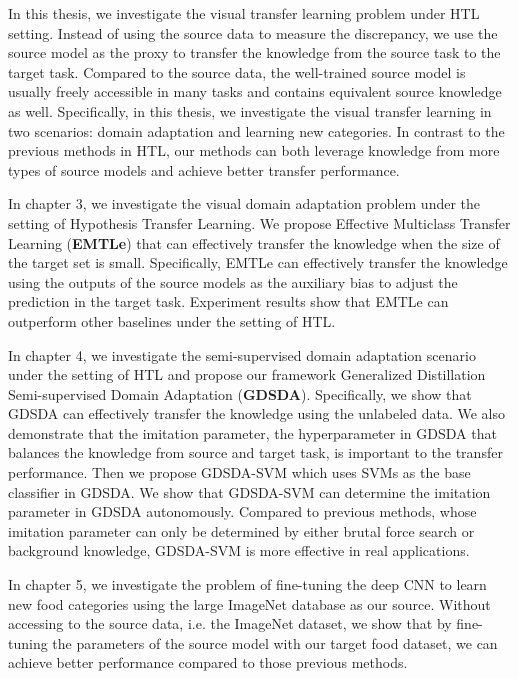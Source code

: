 \documentclass[12pt,twoside]{report}
\numberwithin{figure}{chapter}
\newenvironment{preliminary}%
{\pagestyle{plain}\pagenumbering{roman}}%
{\pagenumbering{arabic}}
\begin{document}
\begin{preliminary}
		In this thesis, we investigate the visual transfer learning problem under HTL setting. Instead of using the source data to measure the discrepancy, we use the source model as the proxy to transfer the knowledge from the source task to the target task. Compared to the source data, the well-trained source model is usually freely accessible in many tasks and contains equivalent source knowledge as well. Specifically, in this thesis, we investigate the visual transfer learning in two scenarios: domain adaptation and learning new categories. In contrast to the previous methods in HTL, our methods can both leverage knowledge from more types of source models and achieve better transfer performance.
		
		In chapter 3, we investigate the visual domain adaptation problem under the setting of Hypothesis Transfer Learning. We propose Effective Multiclass Transfer Learning (\textbf{EMTLe}) that can effectively transfer the knowledge when the size of the target set is small.  Specifically, EMTLe can effectively transfer the knowledge using the outputs of the source models as the auxiliary bias to adjust the prediction in the target task. Experiment results show that EMTLe can outperform other baselines under the setting of HTL.
		
		In chapter 4, we investigate the semi-supervised domain adaptation scenario under the setting of HTL and propose our framework {Generalized Distillation Semi-supervised Domain Adaptation} (\textbf{GDSDA}). Specifically, we show that GDSDA can effectively transfer the knowledge using the unlabeled data. We also demonstrate that the imitation parameter, the hyperparameter in GDSDA that balances the knowledge from source and target task, is important to the transfer performance. Then we propose GDSDA-SVM which uses SVMs as the base classifier in GDSDA. We show that GDSDA-SVM can determine the imitation parameter in GDSDA autonomously. Compared to previous methods, whose imitation parameter can only be determined by either brutal force search or background knowledge, GDSDA-SVM is more effective in real applications.
		
		In chapter 5, we investigate the problem of fine-tuning the deep CNN to learn new food categories using the large ImageNet database as our source. Without accessing to the source data, i.e. the ImageNet dataset, we show that by fine-tuning the parameters of the source model with our target food dataset, we can achieve better performance compared to those previous methods.
		

\end{preliminary}
\end{document}
